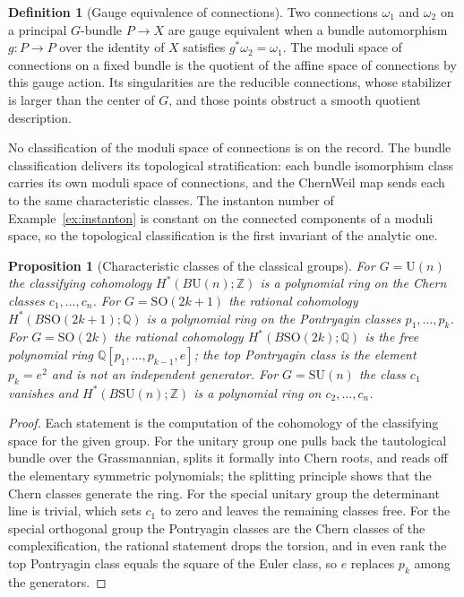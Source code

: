 \documentclass[11pt,letterpaper]{article}
\newtheorem{proposition}[theorem]{Proposition}
\theoremstyle{definition}
\newtheorem{definition}[theorem]{Definition}
\theoremstyle{remark}
\begin{document}
\begin{definition}[Gauge equivalence of connections]
\label{def:gauge-equivalence}
Two connections $\omega_1$ and $\omega_2$ on a principal $G$-bundle $P \to X$ are gauge equivalent when a bundle automorphism $g: P \to P$ over the identity of $X$ satisfies $g^*\omega_2 = \omega_1$. The moduli space of connections on a fixed bundle is the quotient of the affine space of connections by this gauge action. Its singularities are the reducible connections, whose stabilizer is larger than the center of $G$, and those points obstruct a smooth quotient description.
\end{definition}

No classification of the moduli space of connections is on the record. The bundle classification delivers its topological stratification: each bundle isomorphism class carries its own moduli space of connections, and the Chern\textendash{}Weil map sends each to the same characteristic classes. The instanton number of Example~\ref{ex:instanton} is constant on the connected components of a moduli space, so the topological classification is the first invariant of the analytic one.

\begin{proposition}[Characteristic classes of the classical groups]
\label{prop:classical-classes}
For $G = \mathrm{U}(n)$ the classifying cohomology $H^*(B\mathrm{U}(n); \mathbb{Z})$ is a polynomial ring on the Chern classes $c_1, \ldots, c_n$. For $G = \mathrm{SO}(2k+1)$ the rational cohomology $H^*(B\mathrm{SO}(2k+1); \mathbb{Q})$ is a polynomial ring on the Pontryagin classes $p_1, \ldots, p_k$. For $G = \mathrm{SO}(2k)$ the rational cohomology $H^*(B\mathrm{SO}(2k); \mathbb{Q})$ is the free polynomial ring $\mathbb{Q}[p_1, \ldots, p_{k-1}, e]$; the top Pontryagin class is the element $p_k = e^2$ and is not an independent generator. For $G = \mathrm{SU}(n)$ the class $c_1$ vanishes and $H^*(B\mathrm{SU}(n); \mathbb{Z})$ is a polynomial ring on $c_2, \ldots, c_n$.
\end{proposition}

\begin{proof}
Each statement is the computation of the cohomology of the classifying space for the given group. For the unitary group one pulls back the tautological bundle over the Grassmannian, splits it formally into Chern roots, and reads off the elementary symmetric polynomials; the splitting principle shows that the Chern classes generate the ring. For the special unitary group the determinant line is trivial, which sets $c_1$ to zero and leaves the remaining classes free. For the special orthogonal group the Pontryagin classes are the Chern classes of the complexification, the rational statement drops the torsion, and in even rank the top Pontryagin class equals the square of the Euler class, so $e$ replaces $p_k$ among the generators.
\end{proof}
\end{document}
